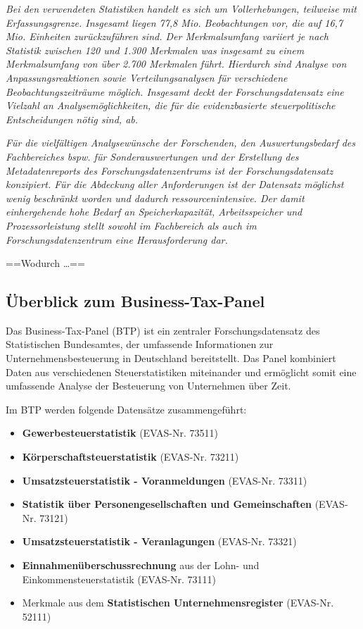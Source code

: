\documentclass[
  german,
  10pt,
  twoside]{article}
\providecommand{\tightlist}{%
  \setlength{\itemsep}{0pt}\setlength{\parskip}{0pt}}
\begin{document}
\emph{Bei den verwendeten Statistiken handelt es sich um Vollerhebungen,
teilweise mit Erfassungsgrenze. Insgesamt liegen 77,8 Mio. Beobachtungen
vor, die auf 16,7 Mio. Einheiten zurückzuführen sind. Der Merkmalsumfang
variiert je nach Statistik zwischen 120 und 1.300 Merkmalen was
insgesamt zu einem Merkmalsumfang von über 2.700 Merkmalen führt.
Hierdurch sind Analyse von Anpassungsreaktionen sowie
Verteilungsanalysen für verschiedene Beobachtungszeiträume möglich.
Insgesamt deckt der Forschungsdatensatz eine Vielzahl an
Analysemöglichkeiten, die für die evidenzbasierte steuerpolitische
Entscheidungen nötig sind, ab.}

\emph{Für die vielfältigen Analysewünsche der Forschenden, den
Auswertungsbedarf des Fachbereiches bspw. für Sonderauswertungen und der
Erstellung des Metadatenreports des Forschungsdatenzentrums ist der
Forschungsdatensatz konzipiert. Für die Abdeckung aller Anforderungen
ist der Datensatz möglichst wenig beschränkt worden und dadurch
ressourcenintensive. Der damit einhergehende hohe Bedarf an
Speicherkapazität, Arbeitsspeicher und Prozessorleistung stellt sowohl
im Fachbereich als auch im Forschungsdatenzentrum eine Herausforderung
dar.}

==Wodurch \ldots==

\subsection{Überblick zum
Business-Tax-Panel}\label{uxfcberblick-zum-business-tax-panel}

Das Business-Tax-Panel (BTP) ist ein zentraler Forschungsdatensatz des
Statistischen Bundesamtes, der umfassende Informationen zur
Unternehmensbesteuerung in Deutschland bereitstellt. Das Panel
kombiniert Daten aus verschiedenen Steuerstatistiken miteinander und
ermöglicht somit eine umfassende Analyse der Besteuerung von Unternehmen
über Zeit.

Im BTP werden folgende Datensätze zusammengeführt:

\begin{itemize}
\tightlist
\item
  \textbf{Gewerbesteuerstatistik} (EVAS-Nr. 73511)
\item
  \textbf{Körperschaftsteuerstatistik} (EVAS-Nr. 73211)
\item
  \textbf{Umsatzsteuerstatistik - Voranmeldungen} (EVAS-Nr. 73311)
\item
  \textbf{Statistik über Personengesellschaften und Gemeinschaften}
  (EVAS-Nr. 73121)
\item
  \textbf{Umsatzsteuerstatistik - Veranlagungen} (EVAS-Nr. 73321)
\item
  \textbf{Einnahmenüberschussrechnung} aus der Lohn- und
  Einkommensteuerstatistik (EVAS-Nr. 73111)
\item
  Merkmale aus dem \textbf{Statistischen Unternehmensregister} (EVAS-Nr.
  52111)
\end{itemize}
\end{document}
